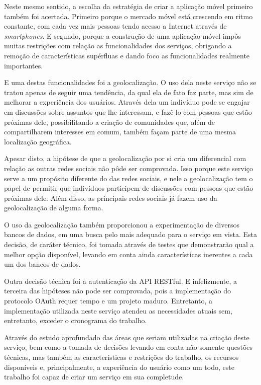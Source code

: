 \documentclass[diss]{template/setrem}
\begin{document}
Neste mesmo sentido, a escolha da estratégia de criar a aplicação móvel primeiro também foi acertada. Primeiro porque o mercado móvel está crescendo em ritmo constante, com cada vez mais pessoas tendo acesso a Internet através de \emph{smartphones}. E segundo, porque a construção de uma aplicação móvel impôs muitas restrições com relação as funcionalidades dos serviços, obrigando a remoção de características supérfluas e dando foco as funcionalidades realmente importantes.

E uma destas funcionalidades foi a geolocalização. O uso dela neste serviço não se tratou apenas de seguir uma tendência, da qual ela de fato faz parte, mas sim de melhorar a experiência dos usuários. Através dela um indivíduo pode se engajar em discussões sobre assuntos que lhe interessam, e fazê-lo com pessoas que estão próximas dele, possibilitando a criação de comunidades que, além de compartilharem interesses em comum, também façam parte de uma mesma localização geográfica.

Apesar disto, a hipótese de que a geolocalização por si cria um diferencial com relação as outras redes sociais não pôde ser comprovada. Isso porque este serviço serve a um propósito diferente do das redes sociais, e nele a geolocalização tem o papel de permitir que indivíduos participem de discussões com pessoas que estão próximas dele. Além disso, as principais redes sociais já fazem uso da geolocalização de alguma forma.

O uso da geolocalização também proporcionou a experimentação de diversos bancos de dados, em uma busca pelo mais adequado para o serviço em vista. Esta decisão, de caráter técnico, foi tomada através de testes que demonstrarão qual a melhor opção disponível, levando em conta ainda características inerentes a cada um dos bancos de dados.

Outra decisão técnica foi a autenticação da API RESTful. E infelizmente, a terceira das hipóteses não pode ser comprovada, pois a implementação do protocolo OAuth requer tempo e um projeto maduro. Entretanto, a implementação utilizada neste serviço atendeu as necessidades atuais sem, entretanto, exceder o cronograma do trabalho.

Através do estudo aprofundado das áreas que seriam utilizadas na criação deste serviço, bem como a tomada de decisões levando em conta não somente questões técnicas, mas também as características e restrições do trabalho, os recursos disponíveis e, principalmente, a experiência do usuário como um todo, este trabalho foi capaz de criar um serviço em sua completude.
\end{document}
